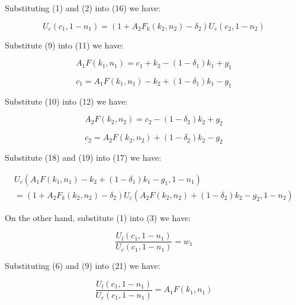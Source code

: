 \documentclass{article}
\begin{document}
Substituting (1) and (2) into (16) we have:

\begin{equation}
    U_{c}\left(c_{1}, 1-n_{1}\right)=\left(1+A_{2}F_{k}\left(k_{2}, n_{2}\right)-\delta_{2}\right)U_{c}\left(c_{2}, 1-n_{2}\right) 
\end{equation}

Substitute (9) into (11) we have:

\begin{equation*}
    A_{1}F\left(k_{1}, n_{1}\right)=c_{1}+k_{2}-\left(1-\delta_{1}\right)k_{1}+g_{1}
\end{equation*}

\begin{equation}
    c_{1}=A_{1}F\left(k_{1}, n_{1}\right)-k_{2}+\left(1-\delta_{1}\right)k_{1}-g_{1}
\end{equation}

Substitute (10) into (12) we have:

\begin{equation*}
    A_{2}F\left(k_{2}, n_{2}\right)=c_{2}-\left(1-\delta_{2}\right)k_{2}+g_{2}
\end{equation*}

\begin{equation}
    c_{2}=A_{2}F\left(k_{2}, n_{2}\right)+\left(1-\delta_{2}\right)k_{2}-g_{2}
\end{equation}

Substitute (18) and (19) into (17) we have:

\begin{multline}
    U_{c}\left(A_{1}F\left(k_{1}, n_{1}\right)-k_{2}+\left(1-\delta_{1}\right)k_{1}-g_{1}, 1-n_{1}\right)\\
    =\left(1+A_{2}F_{k}\left(k_{2}, n_{2}\right)-\delta_{2}\right)U_{c}\left(A_{2}F\left(k_{2}, n_{2}\right)+\left(1-\delta_{2}\right)k_{2}-g_{2}, 1-n_{2}\right) 
\end{multline}

On the other hand, substitute (1) into (3) we have:

\begin{equation}
    \dfrac{U_{l}\left(c_{1}, 1-n_{1}\right)}{U_{c}\left(c_{1}, 1-n_{1}\right)}=w_{1}
\end{equation}

Substituting (6) and (9) into (21) we have:

\begin{equation}
    \dfrac{U_{l}\left(c_{1}, 1-n_{1}\right)}{U_{c}\left(c_{1}, 1-n_{1}\right)}=A_{1}F\left(k_{1}, n_{1}\right)
\end{equation}
\end{document}
